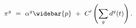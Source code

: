 \begin{equation}
\begin{split}
    \pi^{g} \ 
    & = \ \alpha^{g} \widebar{p} \ + \ C'\left( \sum_{g} d^{g}(t) \right).
\end{split}
\label{Equation:AKS-Style-Model_Necessary-Conditions_Shadow-Price-pi}
\end{equation}
